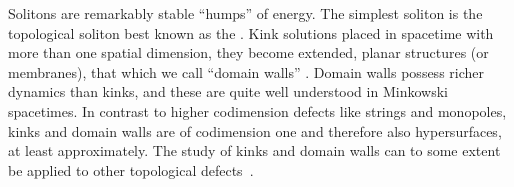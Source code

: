 







 

{Solitons} are remarkably stable ``humps'' of energy. The simplest soliton is the topological soliton best known as the . 
Kink solutions placed in spacetime with more than one spatial dimension, they become extended, planar structures (or membranes), that which we call ``domain walls'' \cite{vachaspatiKinksDomainWalls2006}. 
Domain walls possess richer dynamics than kinks, and these are quite well understood in Minkowski spacetimes. %
In contrast to higher codimension defects like strings and monopoles, kinks and domain walls are of codimension one and therefore also hypersurfaces, at least approximately. %
The study of kinks and domain walls can to some extent be applied to other topological defects~\citep{vachaspatiKinksDomainWalls2006}.


















